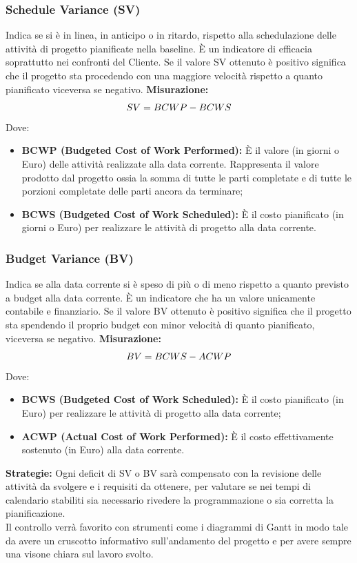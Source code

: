 	 	\subsubsection{Schedule Variance (SV)} Indica se si è in linea, in anticipo o in ritardo, rispetto alla schedulazione delle
attività di progetto pianificate nella baseline.
	 	È un indicatore di efficacia soprattutto nei confronti del Cliente.
	 	Se il valore SV ottenuto è positivo significa che il progetto sta procedendo con una
maggiore velocità rispetto a quanto pianificato viceversa se negativo.\newline
	 	\textbf{Misurazione:}
\newline
	 	\[
	 		SV = BCWP-BCWS \newline
	 	\]
 		Dove:
 		\begin{itemize}
 			\item \textbf{BCWP (Budgeted Cost of Work Performed):} È il valore (in giorni
o Euro) delle attività realizzate alla data corrente. Rappresenta il valore
prodotto dal progetto ossia la somma di tutte le parti completate e di tutte
le porzioni completate delle parti ancora da terminare;
 			\item \textbf{BCWS (Budgeted Cost of Work Scheduled):} È il costo pianificato (in giorni o Euro) per realizzare le attività di progetto alla data corrente. \newline
 		\end{itemize}
	 	\subsubsection{Budget Variance (BV)} Indica se alla data corrente si è speso di più o di meno rispetto a quanto previsto
a budget alla data corrente.
	 	È un indicatore che ha un valore unicamente contabile e finanziario.
	 	Se il valore BV ottenuto è positivo significa che il progetto sta spendendo il proprio
budget con minor velocità di quanto pianificato, viceversa se negativo.\newline
	 	\textbf{Misurazione:}
\newline
	 	\[
	 		BV = BCWS-ACWP \newline
	 	\]
	 	Dove:
	 	\begin{itemize}
	 		\item \textbf{BCWS (Budgeted Cost of Work Scheduled):} È il costo pianificato (in Euro) per realizzare le attività di progetto alla data corrente;

	 		\item \textbf{ACWP (Actual Cost of Work Performed):} È il costo effettivamente sostenuto (in Euro) alla data corrente.
\newline
	 	\end{itemize}
	 	\textbf{Strategie:} Ogni deficit di SV o BV sarà compensato con la revisione delle attività da svolgere e i requisiti da ottenere, per valutare se nei tempi di calendario stabiliti sia necessario rivedere la programmazione o sia corretta la pianificazione.\\
	 	Il controllo verrà favorito con strumenti come i diagrammi di Gantt in modo tale da avere un cruscotto informativo sull'andamento del progetto e per avere sempre una visone chiara sul lavoro svolto.
